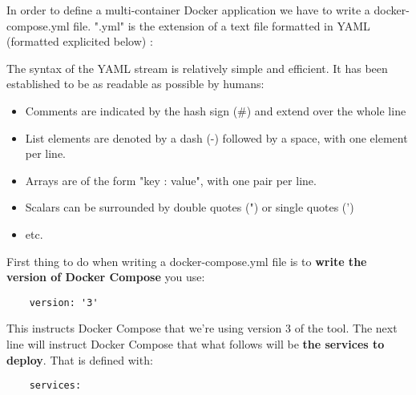 \documentclass[handout]{beamer}[10pt, usepdftitle=false]
\begin{document}
	\begin{frame}
	
	In order to define a multi-container Docker application we have to write a docker-compose.yml file. ".yml" is the extension of a text file formatted in YAML (formatted explicited below) :
	\vspace*{0.6em}
	
	The syntax of the YAML stream is relatively simple and efficient. It has been established to be as readable as possible by humans:
	\vspace*{0.6em}
	
	\begin{itemize}
	\item{Comments are indicated by the hash sign (\#) and extend over the whole line}
	\item{List elements are denoted by a dash (-) followed by a space, with one element per line.}
	\item{Arrays are of the form "key : value", with one pair per line.}
	\item{Scalars can be surrounded by double quotes (") or single quotes (')}
	\item{etc.}		
	\end{itemize}
			
	
	\end{frame}
	\begin{frame}[fragile]
	
	First thing to do when writing a docker-compose.yml file is to \textbf{write the version of Docker Compose} you use:
	\vspace*{0.6em}
	
	\begin{verbatim}
	version: '3'
	\end{verbatim}
	
	This instructs Docker Compose that we're using version 3 of the tool. The next line will instruct Docker Compose that what follows will be \textbf{the services to deploy}. That is defined with: 
	
	\begin{verbatim}
	services:
	\end{verbatim}
	\end{frame}
\end{document}
